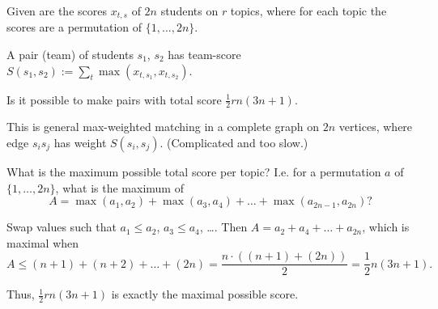 \begin{frame}
    \frametitle{\problemtitle}
    \begin{description}
        \item<+->[Problem:] Given are the scores $x_{t,s}$ of $2n$ students on
          $r$ topics, where for each topic the scores are a permutation of $\{1, \dots, 2n\}$.

          A pair (team) of students $s_1$, $s_2$ has team-score $S(s_1,s_2):=\sum_t \max(x_{t, s_1}, x_{t, s_2})$.

          Is it possible to make pairs with total score $\frac 12 rn(3n+1)$.
        \item<+->[Naive:] This is general max-weighted matching in a complete graph
          on $2n$ vertices, where edge $s_is_j$ has weight $S(s_i, s_j)$.
          (Complicated and too slow.)
        \item<+->[Insight:] What is the maximum possible total score per topic? I.e.
          for a permutation $a$ of $\{1, \dots, 2n\}$, what is the
          maximum of
          $$A = \max(a_1, a_2) + \max(a_3, a_4) + \dots + \max(a_{2n-1}, a_{2n})?$$
        \item<+->[] Swap values such that $a_1 \leq a_2$, $a_3 \leq a_4$, \dots.
          Then $A = a_2 + a_4 + \dots + a_{2n}$, which is maximal when
          $$ A \leq (n+1) + (n+2) + \dots + (2n) = \frac{n \cdot ((n+1) + (2n))}2 =
          \frac 12 n (3n+1).$$
        \item<+->[] Thus, $\frac 12 r n (3n+1)$ is exactly the maximal possible score.
    \end{description}
\end{frame}

